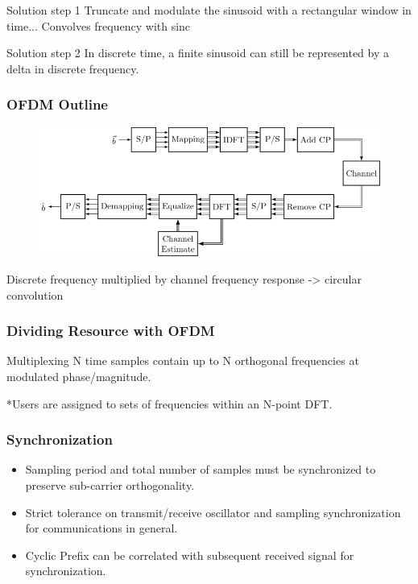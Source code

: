 \documentclass{beamer}
\begin{document}
\begin{frame}
	\begin{block}{Solution step 1}
		Truncate and modulate the sinusoid with a rectangular window in time...
		Convolves frequency with sinc
	\end{block}

	\begin{block}{Solution step 2}
		In discrete time, a finite sinusoid can still be represented by a
		delta in discrete frequency.
	\end{block}

\end{frame}

\begin{frame}[label=OFDM]
	\frametitle{OFDM Outline}
	\begin{figure}
		\includegraphics[scale=.4]{Images/Output/ofdm.png}
		\caption{\cite{ofdmillustration}}
	\end{figure}
	\begin{small}
		Discrete frequency  multiplied by channel frequency response -> circular convolution
	\end{small}
\end{frame}

\begin{frame}
	\frametitle{Dividing Resource with OFDM}
	\begin{block}{Multiplexing}
		N time samples contain up to N orthogonal frequencies at modulated phase/magnitude. 
	\end{block}
	*Users are assigned to sets of frequencies within an N-point DFT.
\end{frame}

\begin{frame}
	\frametitle{Synchronization }
	\begin{itemize}
		\item Sampling period and total number of samples must be synchronized to preserve sub-carrier orthogonality.
		\item Strict tolerance on transmit/receive oscillator and sampling synchronization for communications in general.
		\item Cyclic Prefix can be correlated with subsequent received signal for synchronization. 
	\cite{sandell1995timing}
	\end{itemize}
	
\end{frame}
\end{document}
